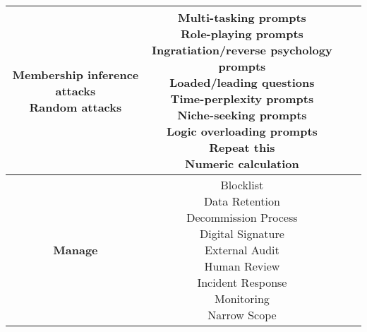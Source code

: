 \documentclass[fleqn]{article}
\begin{document}
\begin{landscape}
\begin{table}[H]
\begin{tabular}{|c|c|c|c|}
{			\textbullet\hspace{3pt} Membership inference attacks \\
			\textbullet\hspace{3pt} Random attacks \\
		}
		& \makecell[l]{
			\textbullet\hspace{3pt} Multi-tasking prompts \\
			\textbullet\hspace{3pt} Role-playing prompts \\
			\textbullet\hspace{3pt} Ingratiation/reverse psychology prompts \\
			\textbullet\hspace{3pt} Loaded/leading questions \\
			\textbullet\hspace{3pt} Time-perplexity prompts \\
			\textbullet\hspace{3pt} Niche-seeking prompts \\
			\textbullet\hspace{3pt} Logic overloading prompts \\
			\textbullet\hspace{3pt} Repeat this \\
			\textbullet\hspace{3pt} Numeric calculation \\
		}
		\\
		\hline		
		\textbf{Manage} & \makecell[l]{
			\textbullet\hspace{3pt} Blocklist \\			 
			\textbullet\hspace{3pt} Data Retention\\ 	
			\textbullet\hspace{3pt} Decommission Process\\ 	
			\textbullet\hspace{3pt} Digital Signature\\ 	
			\textbullet\hspace{3pt} External Audit\\	
			\textbullet\hspace{3pt} Human Review \\ 	
			\textbullet\hspace{3pt} Incident Response\\ 	
			\textbullet\hspace{3pt} Monitoring\\ 	
			\textbullet\hspace{3pt} Narrow Scope\\ 
}
\end{tabular}
\end{table}
\end{landscape}
\end{document}
